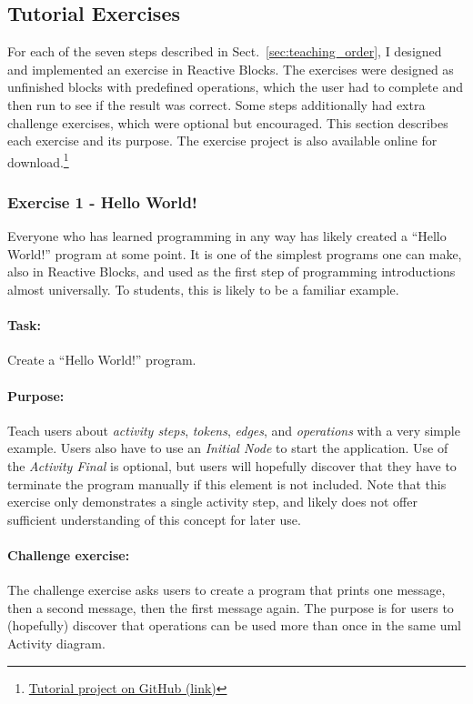 \subsection{Tutorial Exercises}
\label{sec:tutorial_exercises}
For each of the seven steps described in Sect.~\ref{sec:teaching_order}, I designed and implemented an exercise in Reactive Blocks. The exercises were designed as unfinished blocks with predefined operations, which the user had to complete and then run to see if the result was correct. Some steps additionally had extra challenge exercises, which were optional but encouraged. This section describes each exercise and its purpose. The exercise project is also available online for download.\footnote{\href{https://github.com/Desarc/reactive-blocks-tutorials/tree/master/no.ntnu.item.tutorials}{Tutorial project on GitHub (link)}}

\subsubsection{Exercise 1 - Hello World!}
Everyone who has learned programming in any way has likely created a ``Hello World!'' program at some point. It is one of the simplest programs one can make, also in Reactive Blocks, and used as the first step of programming introductions almost universally. To students, this is likely to be a familiar example.

\paragraph{Task:} Create a ``Hello World!'' program.

\paragraph{Purpose:} Teach users about \emph{activity steps}, \emph{tokens}, \emph{edges}, and \emph{operations} with a very simple example. Users also have to use an \emph{Initial Node} to start the application. Use of the \emph{Activity Final} is optional, but users will hopefully discover that they have to terminate the program manually if this element is not included. Note that this exercise only demonstrates a single activity step, and likely does not offer sufficient understanding of this concept for later use.

\paragraph{Challenge exercise:} The challenge exercise asks users to create a program that prints one message, then a second message, then the first message again. The purpose is for users to (hopefully) discover that operations can be used more than once in the same \gls{uml} Activity diagram.

